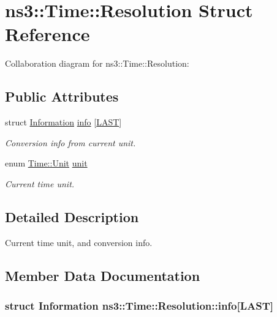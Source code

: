 \hypertarget{structns3_1_1Time_1_1Resolution}{}\section{ns3\+:\+:Time\+:\+:Resolution Struct Reference}
\label{structns3_1_1Time_1_1Resolution}


Collaboration diagram for ns3\+:\+:Time\+:\+:Resolution\+:
\subsection*{Public Attributes}
\begin{DoxyCompactItemize}
\item 
struct \hyperlink{structns3_1_1Time_1_1Information}{Information} \hyperlink{structns3_1_1Time_1_1Resolution_a4e86efe41bea0878e9d0660585ff018b}{info} \mbox{[}\hyperlink{classns3_1_1Time_a87a7f4d29c68b047a72d291ad660295aa755473043e6387ca81410ed6d433439f}{L\+A\+ST}\mbox{]}
\begin{DoxyCompactList}\small\item\em Conversion info from current unit. \end{DoxyCompactList}\item 
enum \hyperlink{classns3_1_1Time_a87a7f4d29c68b047a72d291ad660295a}{Time\+::\+Unit} \hyperlink{structns3_1_1Time_1_1Resolution_a6a95aef10bc5c55186b3b8f587027715}{unit}
\begin{DoxyCompactList}\small\item\em Current time unit. \end{DoxyCompactList}\end{DoxyCompactItemize}


\subsection{Detailed Description}
Current time unit, and conversion info. 

\subsection{Member Data Documentation}
\subsubsection[{\texorpdfstring{info}{info}}]{\setlength{\rightskip}{0pt plus 5cm}struct {\bf Information} ns3\+::\+Time\+::\+Resolution\+::info\mbox{[}{\bf L\+A\+ST}\mbox{]}}\hypertarget{structns3_1_1Time_1_1Resolution_a4e86efe41bea0878e9d0660585ff018b}{}\label{structns3_1_1Time_1_1Resolution_a4e86efe41bea0878e9d0660585ff018b}


